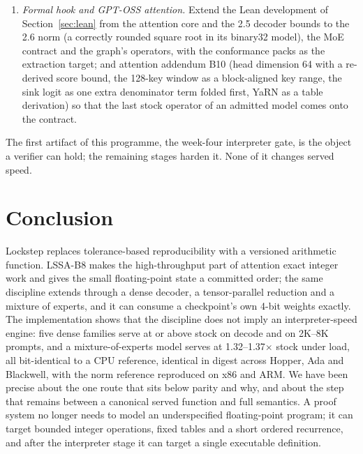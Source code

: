 \documentclass{article}
\begin{document}
\begin{enumerate}
  one-ULP epilogue faults, a swapped reduction order, a wrong tie-break, a requantized expert,
  a preemption and a swapped model behind a correct fingerprint each shown caught by
  re-execution, the argument Chen makes against tolerance suites \cite{chen2026pow2}
  demonstrated on this stack.
  \item \emph{Formal hook and GPT-OSS attention.}  Extend the Lean development of
  Section~\ref{sec:lean} from the attention core and the 2.5 decoder bounds to the 2.6 norm
  (a correctly rounded square root in its binary32 model), the MoE contract and the graph's
  operators, with the conformance packs as the extraction target; and attention addendum B10 (head dimension 64 with a re-derived
  score bound, the 128-key window as a block-aligned key range, the sink logit as one extra
  denominator term folded first, YaRN as a table derivation) so that the last stock operator
  of an admitted model comes onto the contract.
\end{enumerate}
The first artifact of this programme, the week-four interpreter gate, is the object a
verifier can hold; the remaining stages harden it.  None of it changes served speed.

\section{Conclusion}

Lockstep replaces tolerance-based reproducibility with a versioned arithmetic function.
LSSA-B8 makes the high-throughput part of attention exact integer work and gives the small
floating-point state a committed order; the same discipline extends through a dense decoder,
a tensor-parallel reduction and a mixture of experts, and it can consume a checkpoint's own
4-bit weights exactly.  The implementation shows that the discipline does not imply an
interpreter-speed engine: five dense families serve at or above stock on decode and on 2K--8K prompts, and a
mixture-of-experts model serves at 1.32--1.37$\times$ stock under load, all bit-identical to a
CPU reference, identical in digest across Hopper, Ada and Blackwell, with the norm reference
reproduced on x86 and ARM.  We have
been precise about the one route that sits below parity and why, and about the step that
remains between a canonical served function and full semantics.  A proof system no longer
needs to model an underspecified floating-point program; it can target bounded integer
operations, fixed tables and a short ordered recurrence, and after the interpreter stage it can
target a single executable definition.
\end{document}
